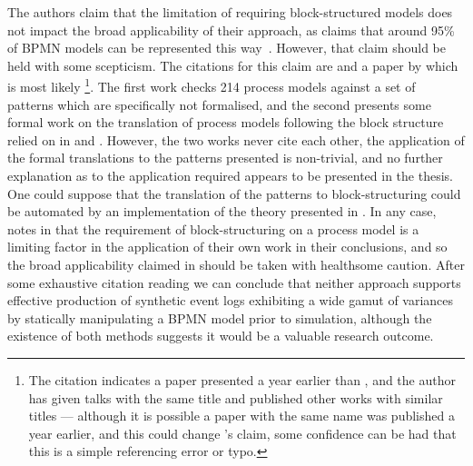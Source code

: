 The authors claim that the limitation of requiring block-structured models does
not impact the broad applicability of their approach, as \citeauthor{chenthesis}
claims that around 95\% of BPMN models can be represented this
way~\cite{chenthesis}. However, that claim should be held with some scepticism.
The citations for this claim are \cite{Thom2009ActivityPI} and a paper by
\citeauthor{polyvyanny2010structuring} which is most likely
\cite{polyvyanny2010structuring}\footnote{The citation indicates a paper
presented a year earlier than \cite{polyvyanny2010structuring}, and the author
has given talks with the same title and published other works with similar
titles --- although it is possible a paper with the same name was published a
year earlier, and this could change \citeauthor{chenthesis}'s claim, some
confidence can be had that this is a simple referencing error or typo.}. The
first work checks 214 process models against a set of patterns which are
specifically not formalised, and the second presents some formal work on the
translation of process models following the block structure relied on in
\cite{pourmasoumi2015business} and \cite{chenthesis}. However, the two works
never cite each other, the application of the formal translations to the
patterns presented is non-trivial, and no further explanation as to the
application required appears to be presented in the thesis. One could suppose
that the translation of the patterns to block-structuring could be automated by
an implementation of the theory presented in \cite{polyvyanny2010structuring}.
In any case, \citeauthor{chenthesis} notes in \cite{chenthesis} that the
requirement of block-structuring on a process model is a limiting factor in the
application of their own work in their conclusions, and so the broad
applicability claimed in \cite{pourmasoumi2015business} should be taken with
healthsome caution. After some exhaustive citation reading we can conclude that
neither approach supports effective production of synthetic event logs
exhibiting a wide gamut of variances by statically manipulating a BPMN model
prior to simulation, although the existence of both methods suggests it would be
a valuable research outcome.





